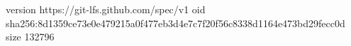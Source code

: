 version https://git-lfs.github.com/spec/v1
oid sha256:8d1359ce73e0e479215a0f477eb3d4e7c7f20f56c8338d1164e473bd29fecc0d
size 132796
